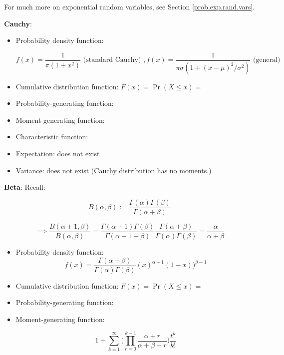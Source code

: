 \begin{itemize}
For much more on exponential random variables, see Section \ref{prob.exp.rand.vars}.

\textbf{Cauchy}: 

\begin{itemize}

\item Probability density function: 

\[
f(x) = \frac{1}{\pi(1 + x^2)} \text{ (standard Cauchy) }, f(x) = \frac{1}{\pi \sigma (1 + (x - \mu)^2/\sigma^2)}  \text{ (general)}
\]

\item Cumulative distribution function: \(F(x) = \Pr(X \leq x) = \)

\item Probability-generating function:

\item Moment-generating function:

\item Characteristic function:

\item Expectation: does not exist

\item Variance: does not exist (Cauchy distribution has no moments.)

\end{itemize}

\textbf{Beta}: Recall:

\[
B(\alpha, \beta) := \frac{\Gamma(\alpha) \Gamma(\beta)}{\Gamma(\alpha + \beta)}
\]

\[
\implies \frac{B(\alpha + 1, \beta)}{B(\alpha, \beta)} = \frac{\Gamma(\alpha + 1) \Gamma(\beta)}{\Gamma(\alpha + 1 + \beta)} \frac{\Gamma(\alpha + \beta)}{\Gamma(\alpha)\Gamma(\beta)} = \frac{\alpha}{\alpha + \beta}
\]

\begin{itemize}

\item Probability density function: 
\[
f(x)= \frac{\Gamma(\alpha + \beta)}{\Gamma(\alpha) \Gamma(\beta)} (x)^{\alpha-1}(1-x))^{\beta - 1}
\]

\item Cumulative distribution function: \(F(x) = \Pr(X \leq x) = \)

\item Probability-generating function:

\item Moment-generating function:

\[
1 + \sum_{k=1}^\infty \Bigg(  \prod_{r=0}^{k-1} \frac{\alpha +r}{\alpha + \beta + r}\Bigg) \frac{t^k}{k!}
\]


\end{itemize}
\end{itemize}
